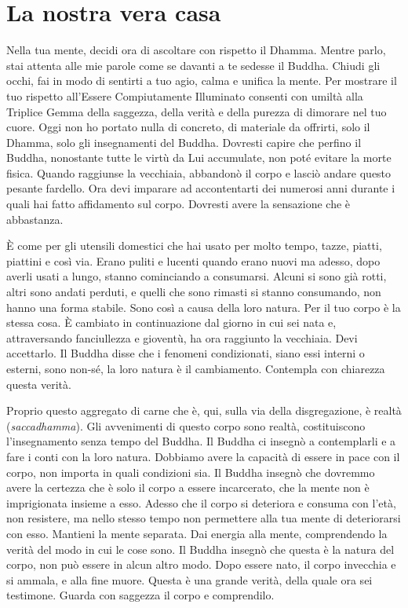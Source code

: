 \chapter{La nostra vera casa}

Nella tua mente, decidi ora di ascoltare con rispetto il Dhamma. Mentre
parlo, stai attenta alle mie parole come se davanti a te sedesse il
Buddha. Chiudi gli occhi, fai in modo di sentirti a tuo agio, calma e
unifica la mente. Per mostrare il tuo rispetto all'Essere Compiutamente
Illuminato consenti con umiltà alla Triplice Gemma della saggezza, della
verità e della purezza di dimorare nel tuo cuore. Oggi non ho portato
nulla di concreto, di materiale da offrirti, solo il Dhamma, solo gli
insegnamenti del Buddha. Dovresti capire che perfino il Buddha,
nonostante tutte le virtù da Lui accumulate, non poté evitare la morte
fisica. Quando raggiunse la vecchiaia, abbandonò il corpo e lasciò
andare questo pesante fardello. Ora devi imparare ad accontentarti dei
numerosi anni durante i quali hai fatto affidamento sul corpo. Dovresti
avere la sensazione che è abbastanza.

È come per gli utensili domestici che hai usato per molto tempo, tazze,
piatti, piattini e così via. Erano puliti e lucenti quando erano nuovi
ma adesso, dopo averli usati a lungo, stanno cominciando a consumarsi.
Alcuni si sono già rotti, altri sono andati perduti, e quelli che sono
rimasti si stanno consumando, non hanno una forma stabile. Sono così a
causa della loro natura. Per il tuo corpo è la stessa cosa. È cambiato
in continuazione dal giorno in cui sei nata e, attraversando
fanciullezza e gioventù, ha ora raggiunto la vecchiaia. Devi accettarlo.
Il Buddha disse che i fenomeni condizionati, siano essi interni o
esterni, sono non-sé, la loro natura è il cambiamento. Contempla con
chiarezza questa verità.

Proprio questo aggregato di carne che è, qui, sulla via della
disgregazione, è realtà (\emph{saccadhamma}). Gli avvenimenti di questo
corpo sono realtà, costituiscono l'insegnamento senza tempo del Buddha.
Il Buddha ci insegnò a contemplarli e a fare i conti con la loro natura.
Dobbiamo avere la capacità di essere in pace con il corpo, non importa
in quali condizioni sia. Il Buddha insegnò che dovremmo avere la
certezza che è solo il corpo a essere incarcerato, che la mente non è
imprigionata insieme a esso. Adesso che il corpo si deteriora e consuma
con l'età, non resistere, ma nello stesso tempo non permettere alla tua
mente di deteriorarsi con esso. Mantieni la mente separata. Dai energia
alla mente, comprendendo la verità del modo in cui le cose sono. Il
Buddha insegnò che questa è la natura del corpo, non può essere in alcun
altro modo. Dopo essere nato, il corpo invecchia e si ammala, e alla
fine muore. Questa è una grande verità, della quale ora sei testimone.
Guarda con saggezza il corpo e comprendilo.


